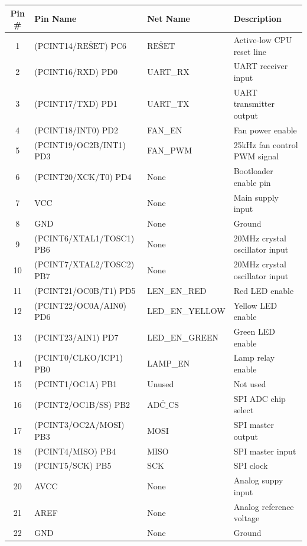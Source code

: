 \documentclass{article}
\newcommand{\textoverline}[1]{$\overline{\mbox{#1}}$}
\newcommand{\abrackets}[1]{\textlangle #1\textrangle}
\begin{document}
\begin{center}
    \begin{tabular}{c|l|l|l}
        Pin \# & Pin Name & Net Name & Description \\
        \hline 
        1  & (PCINT14/\textoverline{RESET}) PC6 & \textoverline{RESET} & Active-low CPU reset line \\
        2  & (PCINT16/RXD) PD0 & UART\_RX & UART receiver input \\
        3  & (PCINT17/TXD) PD1 & UART\_TX & UART transmitter output \\
        4  & (PCINT18/INT0) PD2 & FAN\_EN & Fan power enable \\
        5  & (PCINT19/OC2B/INT1) PD3 & FAN\_PWM & 25kHz fan control PWM signal \\
        6  & (PCINT20/XCK/T0) PD4 & \abrackets{None} & Bootloader enable pin \\
        7  & VCC & \abrackets{None} & Main supply input \\
        8  & GND & \abrackets{None} & Ground \\
        9  & (PCINT6/XTAL1/TOSC1) PB6 & \abrackets{None} & 20MHz crystal oscillator input \\
        10 & (PCINT7/XTAL2/TOSC2) PB7 & \abrackets{None} & 20MHz crystal oscillator input \\
        11 & (PCINT21/OC0B/T1) PD5 & LEN\_EN\_RED & Red LED enable \\
        12 & (PCINT22/OC0A/AIN0) PD6 & LED\_EN\_YELLOW & Yellow LED enable \\
        13 & (PCINT23/AIN1) PD7 & LED\_EN\_GREEN & Green LED enable \\
        14 & (PCINT0/CLKO/ICP1) PB0 & LAMP\_EN & Lamp relay enable \\
        15 & (PCINT1/OC1A) PB1 & \abrackets{Unused} & Not used \\
        16 & (PCINT2/OC1B/SS) PB2 & \textoverline{ADC\_CS} & SPI ADC chip select \\
        17 & (PCINT3/OC2A/MOSI) PB3 & MOSI & SPI master output \\
        18 & (PCINT4/MISO) PB4 & MISO & SPI master input \\
        19 & (PCINT5/SCK) PB5 & SCK & SPI clock \\
        20 & AVCC & \abrackets{None} & Analog suppy input \\
        21 & AREF & \abrackets{None} & Analog reference voltage \\
        22 & GND & \abrackets{None} & Ground \\

\end{tabular}
\end{center}
\end{document}
